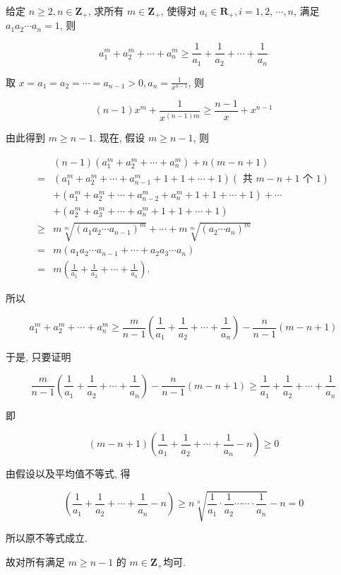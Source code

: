 \begin{example}
	给定 $n \geqslant 2, n \in \mathbf{Z}_{+}$, 求所有 $m \in \mathbf{Z}_{+}$, 使得对 $a_{i} \in \mathbf{R}_{+}, i=1,2$, $\cdots, n$, 满足 $a_{1} a_{2} \cdots a_{n}=1$, 则
	
	$$
	a_{1}^{m}+a_{2}^{m}+\cdots+a_{n}^{m} \geqslant \frac{1}{a_{1}}+\frac{1}{a_{2}}+\cdots+\frac{1}{a_{n}}
	$$
\end{example}
\begin{solution}
	取 $x=a_{1}=a_{2}=\cdots=a_{n-1}>0, a_{n}=\frac{1}{x^{n-1}}$, 则
	
	$$
	(n-1) x^{m}+\frac{1}{x^{(n-1) m}} \geqslant \frac{n-1}{x}+x^{n-1}
	$$
	
	由此得到 $m \geqslant n-1$. 现在, 假设 $m \geqslant n-1$, 则
	
	$$
	\begin{aligned}
	& (n-1)\left(a_{1}^{m}+a_{2}^{m}+\cdots+a_{n}^{m}\right)+n(m-n+1) \\
	= & \left(a_{1}^{m}+a_{2}^{m}+\cdots+a_{n-1}^{m}+1+1+\cdots+1\right)(\text { 共 } m-n+1 \text { 个 } 1) \\
	& +\left(a_{1}^{m}+a_{2}^{m}+\cdots+a_{n-2}^{m}+a_{n}^{m}+1+1+\cdots+1\right)+\cdots \\
	& +\left(a_{2}^{m}+a_{3}^{m}+\cdots+a_{n}^{m}+1+1+\cdots+1\right) \\
	\geqslant & m \sqrt[m]{\left(a_{1} a_{2} \cdots a_{n-1}\right)^{m}}+\cdots+m \sqrt[m]{\left(a_{2} \cdots a_{n}\right)^{m}} \\
	= & m\left(a_{1} a_{2} \cdots a_{n-1}+\cdots+a_{2} a_{3} \cdots a_{n}\right) \\
	= & m\left(\frac{1}{a_{1}}+\frac{1}{a_{2}}+\cdots+\frac{1}{a_{n}}\right) .
	\end{aligned}
	$$
	
	所以
	
	$$
	a_{1}^{m}+a_{2}^{m}+\cdots+a_{n}^{m} \geqslant \frac{m}{n-1}\left(\frac{1}{a_{1}}+\frac{1}{a_{2}}+\cdots+\frac{1}{a_{n}}\right)-\frac{n}{n-1}(m-n+1)
	$$
	
	于是, 只要证明
	
	$$
	\frac{m}{n-1}\left(\frac{1}{a_{1}}+\frac{1}{a_{2}}+\cdots+\frac{1}{a_{n}}\right)-\frac{n}{n-1}(m-n+1) \geqslant \frac{1}{a_{1}}+\frac{1}{a_{2}}+\cdots+\frac{1}{a_{n}}
	$$
	
	即
	
	$$
	(m-n+1)\left(\frac{1}{a_{1}}+\frac{1}{a_{2}}+\cdots+\frac{1}{a_{n}}-n\right) \geqslant 0
	$$
	
	由假设以及平均值不等式, 得
	
	$$
	\left(\frac{1}{a_{1}}+\frac{1}{a_{2}}+\cdots+\frac{1}{a_{n}}-n\right) \geqslant n \sqrt[n]{\frac{1}{a_{1}} \cdot \frac{1}{a_{2}} \cdots \cdots \cdot \frac{1}{a_{n}}}-n=0
	$$
	
	所以原不等式成立.
	
	故对所有满足 $m \geqslant n-1$ 的 $m \in \mathbf{Z}_{+}$均可.
\end{solution}
